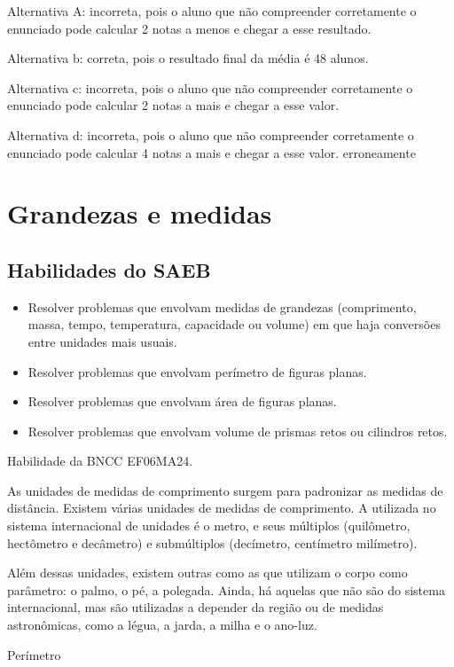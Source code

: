 Alternativa A: incorreta, pois o aluno que não compreender corretamente
o enunciado pode calcular 2 notas a menos e chegar a esse resultado.

Alternativa b: correta, pois o resultado final da média é 48 alunos.

Alternativa c: incorreta, pois o aluno que não compreender corretamente
o enunciado pode calcular 2 notas a mais e chegar a esse valor.

Alternativa d: incorreta, pois o aluno que não compreender corretamente
o enunciado pode calcular 4 notas a mais e chegar a esse valor.
erroneamente

\chapter{Grandezas e medidas}

\section{Habilidades do SAEB}

\begin{itemize}
\item
  Resolver problemas que envolvam medidas de grandezas (comprimento,
  massa, tempo, temperatura, capacidade ou volume) em que haja
  conversões entre unidades mais usuais.
\item
  Resolver problemas que envolvam perímetro de figuras planas.
\item
  Resolver problemas que envolvam área de figuras planas.
\item
  Resolver problemas que envolvam volume de prismas retos ou cilindros
  retos.
\end{itemize}

Habilidade da BNCC EF06MA24.

As unidades de medidas de comprimento surgem para padronizar as medidas
de distância. Existem várias unidades de medidas de comprimento. A
utilizada no sistema internacional de unidades é o metro, e seus
múltiplos (quilômetro, hectômetro e decâmetro) e submúltiplos
(decímetro, centímetro milímetro).

Além dessas unidades, existem outras como as que utilizam o corpo como
parâmetro: o palmo, o pé, a polegada. Ainda, há aquelas que não são do
sistema internacional, mas são utilizadas a depender da região ou de
medidas astronômicas, como a légua, a jarda, a milha e o ano-luz.

Perímetro


